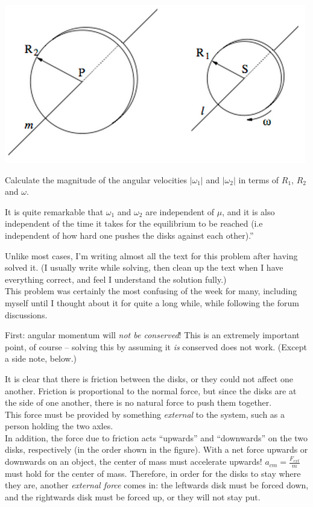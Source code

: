 \documentclass[8.01x]{subfiles}
\begin{document}
\begin{center}
\includegraphics[scale=0.8]{Graphics/h7p8}
\end{center}

Calculate the magnitude of the angular velocities $|\omega_1|$ and $|\omega_2|$ in terms of $R_1$, $R_2$ and $\omega$.

It is quite remarkable that $\omega_1$ and $\omega_2$ are independent of $\mu$, and it is also independent of the time it takes for the equilibrium to be reached (i.e independent of how hard one pushes the disks against each other).''

Unlike most cases, I'm writing almost all the text for this problem after having solved it. (I usually write while solving, then clean up the text when I have everything correct, and feel I understand the solution fully.)\\
This problem was certainly the most confusing of the week for many, including myself until I thought about it for quite a long while, while following the forum discussions.

First: angular momentum will \emph{not be conserved}! This is an extremely important point, of course -- solving this by assuming it \emph{is} conserved does not work. (Except a side note, below.)

It is clear that there is friction between the disks, or they could not affect one another. Friction is proportional to the normal force, but since the disks are at the side of one another, there is no natural force to push them together.\\
This force must be provided by something \emph{external} to the system, such as a person holding the two axles.\\
In addition, the force due to friction acts ``upwards'' and ``downwards'' on the two disks, respectively (in the order shown in the figure). With a net force upwards or downwards on an object, the center of mass must accelerate upwards! $\displaystyle a_{cm} = \frac{F_{ext}}{m}$ must hold for the center of mass. Therefore, in order for the disks to stay where they are, another \emph{external force} comes in: the leftwards disk must be forced down, and the rightwards disk must be forced up, or they will not stay put.
\end{document}
